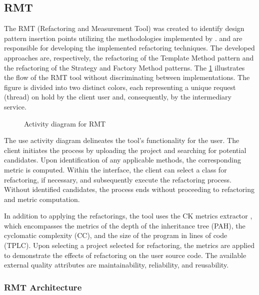 \subsection{RMT}
\label{sub-rmt}

The RMT (Refactoring and Measurement Tool) was created to identify design pattern insertion points utilizing the methodologies implemented by \textcite{beluzzo2018abordagem}. \textcite{zafeiris2017automated} and \textcite{liu2014automated} are responsible for developing the implemented refactoring techniques. The developed approaches are, respectively, the refactoring of the Template Method pattern and the refactoring of the Strategy and Factory Method patterns. The \cref{fig-activity-rmt} illustrates the flow of the RMT tool without discriminating between implementations. The figure is divided into two distinct colors, each representing a unique request (thread) on hold by the client user and, consequently, by the intermediary service.

\begin{figure}[ht!]
\SetCaptionWidth{\textwidth}
\caption{Activity diagram for RMT}
\label{fig-activity-rmt}
\fontsize{3.8}{5}\selectfont

\end{figure}
\FloatBarrier

The use activity diagram delineates the tool's functionality for the user. The client initiates the process by uploading the project and searching for potential candidates. Upon identification of any applicable methods, the corresponding metric is computed. Within the interface, the client can select a class for refactoring, if necessary, and subsequently execute the refactoring process. Without identified candidates, the process ends without proceeding to refactoring and metric computation.

In addition to applying the refactorings, the tool uses the CK metrics extractor \cite{ck}, which encompasses the metrics of the depth of the inheritance tree (PAH), the cyclomatic complexity (CC), and the size of the program in lines of code (TPLC). Upon selecting a project selected for refactoring, the metrics are applied to demonstrate the effects of refactoring on the user source code. The available external quality attributes are maintainability, reliability, and reusability.

\subsubsection{RMT Architecture}
\label{sub-architecture}

